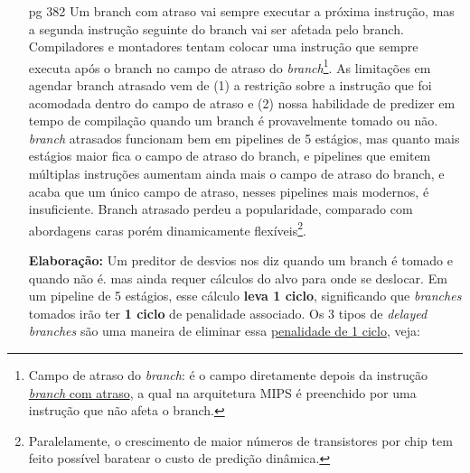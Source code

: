 \documentclass{article}
\begin{document}
\begin{enumerate}
A implementação, vista a grosso modo, se da pelas alternativas (1): tabela
histórico de desvios é feita em cache dedicada, indexada pelos bits menos
significativos do endereço de desvio, e o acesso acontece no estágio de
\underline{Busca da Instrução} (IF); alternativa (2) a tabela histórico de
desvios é embutido na cache de instruções e exitem um campo para armazenas par
de bits extras para o controle. O esquema de dois bits é uma instancia
generalizada de um contador-preditor, ele incremente quando uma predição é bem
sucedida e decrementa quando uma predição é mau sucedida.\footnote{Implementando
um preditor de 2 bits, quando temos um branch que fortemente é tomado ou é
fortemente não tomado, estatisticamente os \textit{branches} são assim. Ou eles
são muito tomados, ou são muito não tomados, esse preditor de 2-bits se da
melhor em preencher a tabela histórico.}

\item[pg 382] Um branch com atraso vai sempre executar a próxima instrução, mas
a segunda instrução seguinte do branch vai ser afetada pelo branch. Compiladores
e montadores tentam colocar uma instrução que sempre executa após o branch no
campo de atraso do \textit{branch}\footnote{Campo de atraso do \textit{branch}:
é o campo diretamente depois da instrução \underline{\textit{branch} com
atraso}, a qual na arquitetura MIPS é preenchido por uma instrução que não afeta
o branch.}. As limitações em agendar branch atrasado vem de (1) a restrição
sobre a instrução que foi acomodada dentro do campo de atraso e (2) nossa
habilidade de predizer em tempo de compilação quando um branch é provavelmente
tomado ou não. \textit{branch} atrasados funcionam bem em pipelines de 5
estágios, mas quanto mais estágios maior fica o campo de atraso do branch, e
pipelines que emitem múltiplas instruções aumentam ainda mais o campo de atraso
do branch, e acaba que um único campo de atraso, nesses pipelines mais modernos,
é insuficiente. Branch atrasado perdeu a popularidade, comparado com abordagens
caras porém dinamicamente flexíveis\footnote{Paralelamente, o crescimento de
maior números de transistores por chip tem feito possível baratear o custo de
predição dinâmica.}.

\textbf{Elaboração:} Um preditor de desvios nos diz quando um branch é tomado e
quando não é. mas ainda requer cálculos do alvo para onde se deslocar. Em um
pipeline de 5 estágios, esse cálculo \textbf{leva 1 ciclo}, significando que
\textit{branches} tomados irão ter \textbf{1 ciclo} de penalidade associado. Os
3 tipos de \textit{delayed} \textit{branches} são uma maneira de eliminar essa
\underline{penalidade de 1 ciclo}, veja:


\end{enumerate}
\end{document}
